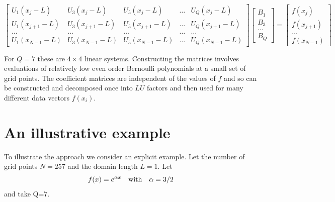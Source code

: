 \documentclass{jfm-like}
\begin{document}
\footnotesize
\begin{equation}
\begin{bmatrix}
U_1(x_{j}-L) & U_3(x_{j}-L) & U_5(x_{j}-L) & \dots & U_Q(x_{j}-L) \\
U_1(x_{j+1}-L) & U_3(x_{j+1}-L) & U_5(x_{j+1}-L) & \dots & U_Q(x_{j+1}-L)\\
\dots  & \dots  & \dots  & \dots & \dots  \\
U_1(x_{N-1}-L) & U_3(x_{N-1}-L) & U_5(x_{N-1}-L) & \dots & U_Q(x_{N-1}-L)
\end{bmatrix}
\begin{bmatrix}
B_1 \\ B_3 \\ \dots \\ B_{Q} 
\end{bmatrix}
=
\begin{bmatrix}
f(x_{j}) \\ f(x_{j+1}) \\ \dots \\ f(x_{N-1})
\end{bmatrix}
\label{eq:mat2}
\end{equation}
\normalsize


For $Q=7$ these are $4 \times 4$ linear systems. Constructing the matrices involves evaluations of relatively low even order Bernoulli polynomials at a small set of grid points.
The coefficient matrices are independent of the values of $f$ and so can be constructed and decomposed once into $LU$  factors and then used
for many different data vectors $f(x_i)$. 


\section{An illustrative example}
To illustrate the approach we consider an explicit example. Let the number of grid points $N=257$ and the domain length $L=1$. Let
\begin{equation}
f(x) = e^{\alpha x} ~~~{\rm with}~~~ \alpha = 3/2
\end{equation}
and take Q=7.
\end{document}
